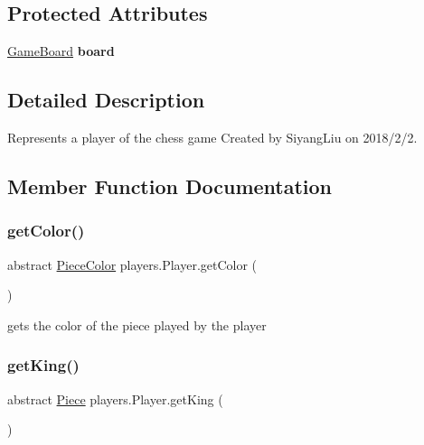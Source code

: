 \subsection*{Protected Attributes}
\begin{DoxyCompactItemize}
\item 
\mbox{\label{classplayers_1_1_player_a1dd0db71975939835fe192a4062164fe}} 
\mbox{\hyperlink{classgameboard_1_1_game_board}{Game\+Board}} {\bfseries board}
\end{DoxyCompactItemize}


\subsection{Detailed Description}
Represents a player of the chess game Created by Siyang\+Liu on 2018/2/2. 

\subsection{Member Function Documentation}
\mbox{\label{classplayers_1_1_player_a806f2042576092dced6bf5b9600f7763}} 
\subsubsection{\texorpdfstring{get\+Color()}{getColor()}}
{\footnotesize\ttfamily abstract \mbox{\hyperlink{enumpieces_1_1_piece_1_1_piece_color}{Piece\+Color}} players.\+Player.\+get\+Color (\begin{DoxyParamCaption}{ }\end{DoxyParamCaption})\hspace{0.3cm}{\ttfamily [abstract]}}

gets the color of the piece played by the player \mbox{\label{classplayers_1_1_player_a7a8d0f9a4ff654c5e1d936c8069d39ca}} 
\subsubsection{\texorpdfstring{get\+King()}{getKing()}}
{\footnotesize\ttfamily abstract \mbox{\hyperlink{classpieces_1_1_piece}{Piece}} players.\+Player.\+get\+King (\begin{DoxyParamCaption}{ }\end{DoxyParamCaption})\hspace{0.3cm}{\ttfamily [abstract]}}

